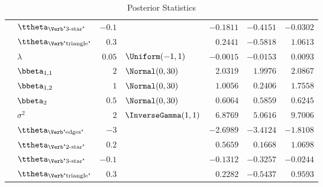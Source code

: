 \begin{table}[t]
\begin{tabular}{cl|rlrrr}
        & $\ttheta_{\text{\Verb"3-star"}}$   & $-0.1$ &  & $-0.1811$ & $-0.4151$ & $-0.0302$ \\
        & $\ttheta_{\text{\Verb"triangle"}}$ & $0.3$  &   & $0.2441$  & $-0.5818$ & $1.0613$  \\
		\midrule
        & $\lambda$                          & $0.05$ & $\Uniform(-1,1)$         & $-0.0015$ & $-0.0153$ & $0.0093$  \\
        & $\bbeta_{1,1}$                     & $2$    & $\Normal(0,30)$          & $2.0319$  & $1.9976$  & $2.0867$  \\
        & $\bbeta_{1,2}$                     & $1$    & $\Normal(0,30)$          & $1.0056$  & $0.2406$  & $1.7558$  \\
        & $\bbeta_{2}$                       & $0.5$  & $\Normal(0,30)$          & $0.6064$  & $0.5859$  & $0.6245$  \\
        & $\sigma^2$                         & $2$    & $\InverseGamma(1,1)$     & $6.8769$  & $5.0616$  & $9.7006$  \\
        & $\ttheta_{\text{\Verb"edges"}}$    & $-3$   &    & $-2.6989$ & $-3.4124$ & $-1.8108$ \\
        & $\ttheta_{\text{\Verb"2-star"}}$   & $0.2$  &   & $0.5659$  & $0.1668$  & $1.0698$  \\
        & $\ttheta_{\text{\Verb"3-star"}}$   & $-0.1$ &  & $-0.1312$ & $-0.3257$ & $-0.0244$ \\
        & $\ttheta_{\text{\Verb"triangle"}}$ & $0.3$  &   & $0.2282$  & $-0.5437$ & $0.9593$  \\
		\bottomrule
	\end{tabular}
	\caption{Posterior Statistics}
	\label{tab:K-1}
\end{table}

